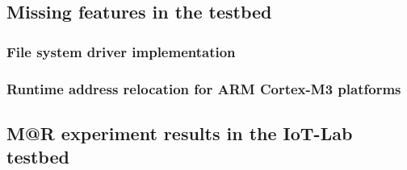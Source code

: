 \subsection{Missing features in the testbed}

\subsubsection{File system driver implementation}

\subsubsection{Runtime address relocation for ARM Cortex-M3 platforms}

\subsection{M@R experiment results in the IoT-Lab testbed}